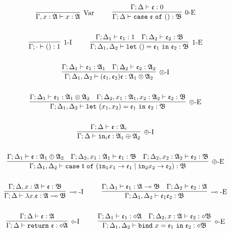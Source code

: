 \begin{gather*}
\infer[\mbox{Var}]{\Gamma, x: \A \vdash x : \A}{}
~~~~ ~~~~
\infer[0\mbox{-E}]{\Gamma; \Delta \vdash \mathtt{case}~\e~\mathtt{of}~() : \mathfrak{B}}{\Gamma; \Delta \vdash \e : 0}
\\ \\ 
\infer[1\mbox{-I}]{\Gamma; \cdot \vdash () : 1}{}
~~~~ ~~~~
\infer[1\mbox{-E}]{\Gamma; \Delta_1, \Delta_2 \vdash \mathtt{let}~() = \e_1~\mathtt{in}~\e_2 : \mathfrak{B}}{
    \Gamma; \Delta_1 \vdash \e_1 : 1
    &
    \Gamma; \Delta_2 \vdash \e_2 : \mathfrak{B}
}
\\ \\ 
\infer[\otimes\mbox{-I}]{\Gamma; \Delta_1, \Delta_2 \vdash (\e_1, \e_2) \e : \A_1 \otimes \A_2}{
    \Gamma; \Delta_1 \vdash \e_1 : \A_1
    &
    \Gamma; \Delta_2 \vdash \e_2 : \A_2
}
\\ \\ 
\infer[\otimes\mbox{-E}]{\Gamma; \Delta_1, \Delta_2 \vdash \mathtt{let}~(x_1, x_2) = \e_1~\mathtt{in}~\e_2 : \mathfrak{B}}{
    \Gamma; \Delta_1 \vdash \e_1 : \A_1 \otimes \A_2
    &
    \Gamma; \Delta_2, x_1 : \A_1, x_2 : \A_2 \vdash \e_2 : \mathfrak{B}
}
\\ \\ 
\infer[\oplus\mbox{-I}]{\Gamma; \Delta \vdash \mathtt{in}_i \e : \A_1 \oplus \A_2}{\Gamma; \Delta \vdash \e : \A_i}
\\ \\
\infer[\oplus\mbox{-E}]{\Gamma; \Delta_1, \Delta_2 \vdash \mathtt{case}~\t~\mathtt{of}~(\mathtt{in}_1 x_1 \rightarrow \e_1 \mid \mathtt{in}_2 x_2 \rightarrow \e_2) : \mathfrak{B}}{
    \Gamma; \Delta_1 \vdash \e : \A_1 \oplus \A_2
    &
    \Gamma; \Delta_2, x_1 : \A_1 \vdash \e_1 : \mathfrak{B}
    &
    \Gamma; \Delta_2, x_2 : \A_2 \vdash \e_2 : \mathfrak{B}
}
\\ \\ 
\infer[\multimap\mbox{-I}]{\Gamma; \Delta \vdash \lambda x. \e : \A \multimap \mathfrak{B}}{\Gamma; \Delta, x : \A \vdash \e : \mathfrak{B}}
~~~~ ~~~~
\infer[\multimap\mbox{-E}]{\Gamma; \Delta_1, \Delta_2 \vdash \e_1\e_2 : \mathfrak{B}}{
    \Gamma; \Delta_1 \vdash \e_1 : \A \multimap \mathfrak{B}
    &
    \Gamma; \Delta_2 \vdash \e_2 : \A
}
\\ \\ 
\infer[\diamond\mbox{-I}]{\Gamma; \Delta \vdash \mathtt{return}~\e : \diamond\A}{\Gamma; \Delta \vdash \e : \A}
~~~~ ~~~~
\infer[\diamond\mbox{-E}]{\Gamma; \Delta_1, \Delta_2 \vdash \mathtt{bind}~x = \e_1~\mathtt{in}~\e_2 : \diamond\mathfrak{B}}{
    \Gamma; \Delta_1 \vdash \e_1 : \diamond\A
    &
    \Gamma; \Delta_2, x : \A \vdash \e_2 : \diamond\mathfrak{B}
}
\end{gather*}